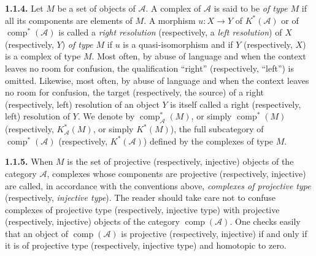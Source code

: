 \medskip\noindent\textbf{1.1.4.}\quad
Let $M$ be a set of objects of $\mathcal A$. A complex of $\mathcal A$ is
said to be \emph{of type $M$} if all its components are elements of $M$. A
morphism $u\colon X\longrightarrow Y$ of $K^{*}(\mathcal A)$ or of
$\operatorname{comp}^{*}(\mathcal A)$ is called a \emph{right resolution}
(respectively, a \emph{left resolution}) of $X$ (respectively, $Y$)
\emph{of type $M$} if $u$ is a quasi-isomorphism and if $Y$ (respectively,
$X$) is a complex of type $M$. Most often, by abuse of language and when
the context leaves no room for confusion, the qualification ``right''
(respectively, ``left'') is omitted. Likewise, most often, by abuse of
language and when the context leaves no room for confusion, the target
(respectively, the source) of a right (respectively, left) resolution of an
object $Y$ is itself called a right (respectively, left) resolution of
$Y$. We denote by $\operatorname{comp}_{\mathcal A}^{*}(M)$, or simply
$\operatorname{comp}^{*}(M)$ (respectively, $K_{\mathcal A}^{*}(M)$, or
simply $K^{*}(M)$), the full subcategory of
$\operatorname{comp}^{*}(\mathcal A)$ (respectively, $K^{*}(\mathcal A)$)
defined by the complexes of type $M$.

\medskip\noindent\textbf{1.1.5.}\quad
When $M$ is the set of projective (respectively, injective) objects of the
category $\mathcal A$, complexes whose components are projective
(respectively, injective) are called, in accordance with the conventions
above, \emph{complexes of projective type} (respectively, \emph{injective
type}). The reader should take care not to confuse complexes of projective
type (respectively, injective type) with projective (respectively,
injective) objects of the category $\operatorname{comp}(\mathcal A)$. One
checks easily that an object of $\operatorname{comp}(\mathcal A)$ is
projective (respectively, injective) if and only if it is of projective type
(respectively, injective type) and homotopic to zero.
\endgroup
